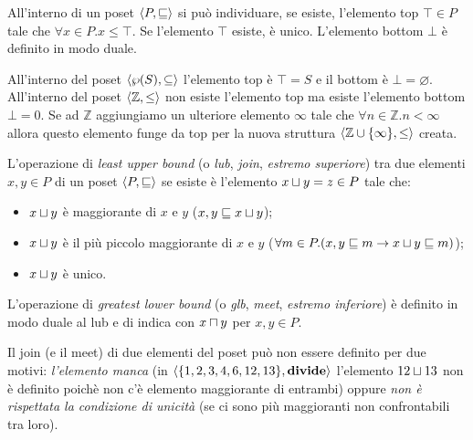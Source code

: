 \begin{definition}
All'interno di un poset $\langle P, \sqsubseteq \rangle$ si può individuare, se esiste, l'elemento top $\top \in P$ tale che $\forall x \in P . x \le \top$. Se l'elemento $\top$ esiste, è unico. L'elemento bottom $\bot$ è definito in modo duale.
\end{definition}

All'interno del poset $\langle \wp(S), \subseteq \rangle$ l'elemento top è $\top = S$ e il bottom è $\bot = \varnothing$. All'interno del poset $\langle \mathbb{Z}, \le \rangle$ non esiste l'elemento top ma esiste l'elemento bottom $\bot = 0$. Se ad $\mathbb{Z}$ aggiungiamo un ulteriore elemento $\infty$ tale che $\forall n \in \mathbb{Z} . n < \infty$ allora questo elemento funge da top per la nuova struttura $\langle \mathbb{Z} \cup \{ \infty \}, \le \rangle$ creata.

\begin{definition}
L'operazione di \emph{least upper bound} (o \emph{lub}, \emph{join}, \emph{estremo superiore}) tra due elementi $x,y \in P$ di un poset $\langle P, \sqsubseteq \rangle$ se esiste è l'elemento $\join[x][y] = z \in P$ tale che:
\begin{itemize}
    \item $\join[x][y]$ è maggiorante di $x$ e $y$ ($x,y \sqsubseteq \join[x][y]$);
    \item $\join[x][y]$ è il più piccolo maggiorante di $x$ e $y$ ($\forall m \in P . (x,y \sqsubseteq m \to \join[x][y] \sqsubseteq m)$);
    \item $\join[x][y]$ è unico.
\end{itemize}
\end{definition}

\begin{definition}
L'operazione di \emph{greatest lower bound} (o \emph{glb}, \emph{meet}, \emph{estremo inferiore}) è definito in modo duale al lub e di indica con $\meet[x][y]$ per $x,y \in P$.
\end{definition}

Il join (e il meet) di due elementi del poset può non essere definito per due motivi: \emph{l'elemento manca} (in $\langle \{1,2,3,4,6,12,13\}, \mathbf{divide} \rangle$ l'elemento $\join[12][13]$ non è definito poichè non c'è elemento maggiorante di entrambi) oppure \emph{non è rispettata la condizione di unicità} (se ci sono più maggioranti non confrontabili tra loro).

